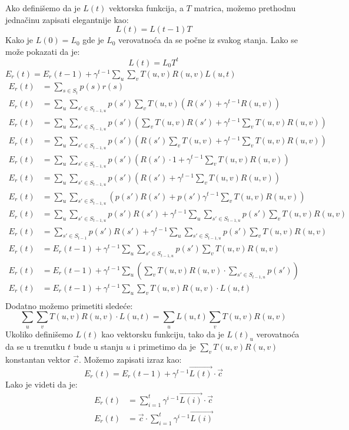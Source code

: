\documentclass[a4paper,fleqn,12pt]{JMThesis}
\theoremstyle{plain}
\theoremstyle{definition}
\theoremstyle{definition}
\begin{document}
Ako definišemo da je $L(t)$ vektorska funkcija, a $T$ matrica, možemo prethodnu jednačinu zapisati elegantnije kao:
\[ L(t) = L(t-1)T \]
Kako je $L(0) = L_0$ gde je $L_0$ verovatnoća da se počne iz svakog stanja. Lako se može pokazati da je:
\[ L(t) = L_0T^t \]
\lem $E_r(t) = E_r(t-1) + \gamma^{t-1}\sum_{u}\sum_{v}T(u,v)R(u,v)L(u,t)$
\[
\begin{split}
	E_r(t) &= \sum_{s \in S_t}p(s)r(s)	\\
	E_r(t) &= \sum_u \sum_{s' \in S_{t-1,u}}p(s')\sum_{v}T(u,v)(R(s') + \gamma^{t-1} R(u,v))\\
	E_r(t) &= \sum_u \sum_{s' \in S_{t-1,u}}p(s')(\sum_{v}T(u,v)R(s') + \gamma^{t-1} \sum_{v}T(u,v)R(u,v))\\
	E_r(t) &= \sum_u \sum_{s' \in S_{t-1,u}}p(s')(R(s')\sum_{v}T(u,v) + \gamma^{t-1} \sum_{v}T(u,v)R(u,v))\\
	E_r(t) &= \sum_u \sum_{s' \in S_{t-1,u}}p(s')(R(s')\cdot 1 + \gamma^{t-1} \sum_{v}T(u,v)R(u,v))\\
	E_r(t) &= \sum_u \sum_{s' \in S_{t-1,u}}p(s')(R(s') + \gamma^{t-1} \sum_{v}T(u,v)R(u,v))\\
	E_r(t) &= \sum_u \sum_{s' \in S_{t-1,u}}\left(p(s')R(s') + p(s')\gamma^{t-1}\sum_{v}T(u,v)R(u,v)\right)\\
	E_r(t) &= \sum_u \sum_{s' \in S_{t-1,u}}p(s')R(s') + \gamma^{t-1}\sum_u \sum_{s' \in S_{t-1,u}}p(s')\sum_{v}T(u,v)R(u,v)\\
	E_r(t) &= \sum_{s' \in S_{t-1}}p(s')R(s') + \gamma^{t-1}\sum_u \sum_{s' \in S_{t-1,u}}p(s')\sum_{v}T(u,v)R(u,v)\\
	E_r(t) &= E_r(t-1) + \gamma^{t-1}\sum_u \sum_{s' \in S_{t-1,u}}p(s')\sum_{v}T(u,v)R(u,v)\\
	E_r(t) &= E_r(t-1) + \gamma^{t-1}\sum_u \left(\sum_{v}T(u,v)R(u,v) \cdot \sum_{s' \in S_{t-1,u}}p(s')\right)\\
	E_r(t) &= E_r(t-1) + \gamma^{t-1}\sum_u \sum_{v}T(u,v)R(u,v) \cdot L(u,t)\\
\end{split}
\]
Dodatno možemo primetiti sledeće:
\[
	\sum_u \sum_{v}T(u,v)R(u,v) \cdot L(u,t) = \sum_u L(u,t)\sum_{v}T(u,v)R(u,v)
\]
Ukoliko definišemo $L(t)$ kao vektorsku funkciju, tako da je $L(t)_u$ verovatnoća da se u trenutku $t$ bude u stanju $u$ i primetimo da je $\sum_{v}T(u,v)R(u,v)$ konstantan vektor $\vec{c}$.
Možemo zapisati izraz kao:
\[
	E_r(t) = E_r(t-1) + \gamma^{t-1}\vec{L(t)} \cdot \vec{c}
\]  
Lako je videti da je:
\[
	\begin{split}
	E_r(t) &= \sum_{i=1}^{t}\gamma^{i-1}\vec{L(i)} \cdot \vec{c}\\
	E_r(t) &= \vec{c} \cdot \sum_{i=1}^{t}\gamma^{i-1}\vec{L(i)}
	\end{split}
\]
\end{document}
